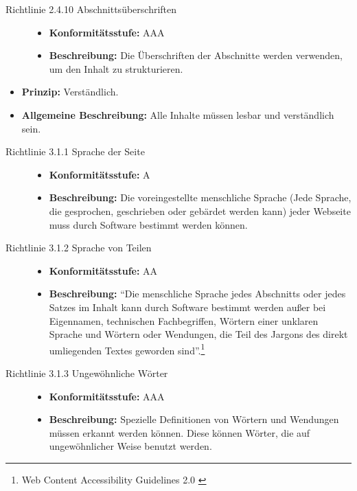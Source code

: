 \begin{description}
\begin{description}
		\item[Richtlinie 2.4.10 Abschnittsüberschriften]\hfill
		\begin{itemize}
			\item \textbf{Konformitätsstufe:} AAA
			\item \textbf{Beschreibung:} Die Überschriften der Abschnitte werden verwenden, um den Inhalt zu strukturieren.
		\end{itemize}
	\end{description}	
	
	\item[Richtlinie 3.1 Lesbar]\hfill
	\begin{itemize}
		\item \textbf{Prinzip:} Verständlich.
		\item \textbf{Allgemeine Beschreibung:} Alle Inhalte müssen lesbar und verständlich sein.
	\end{itemize}
	
	\begin{description}
		\item[Richtlinie 3.1.1 Sprache der Seite]\hfill
		\begin{itemize}
			\item \textbf{Konformitätsstufe:} A
			\item \textbf{Beschreibung:} Die voreingestellte menschliche Sprache (Jede Sprache, die gesprochen, geschrieben oder gebärdet werden kann) jeder Webseite muss 
			durch Software bestimmt werden können.
		\end{itemize}
		
		\item[Richtlinie 3.1.2 Sprache von Teilen]\hfill
		\begin{itemize}
			\item \textbf{Konformitätsstufe:} AA
			\item \textbf{Beschreibung:} "`Die menschliche Sprache jedes Abschnitts oder jedes Satzes im Inhalt kann durch Software bestimmt werden außer
			bei Eigennamen, technischen Fachbegriffen, Wörtern einer unklaren Sprache und Wörtern oder Wendungen, die Teil des Jargons des direkt 
			umliegenden Textes geworden sind"'.\footnote{Web Content Accessibility Guidelines 2.0 \cite{WCAG2.0}}
		\end{itemize}
		
		\item[Richtlinie 3.1.3 Ungewöhnliche Wörter]\hfill
		\begin{itemize}
			\item \textbf{Konformitätsstufe:} AAA
			\item \textbf{Beschreibung:} Spezielle Definitionen von Wörtern und Wendungen müssen erkannt werden können. Diese können Wörter, die auf ungewöhnlicher 
			Weise benutzt werden.
		\end{itemize}
		

\end{description}
\end{description}
